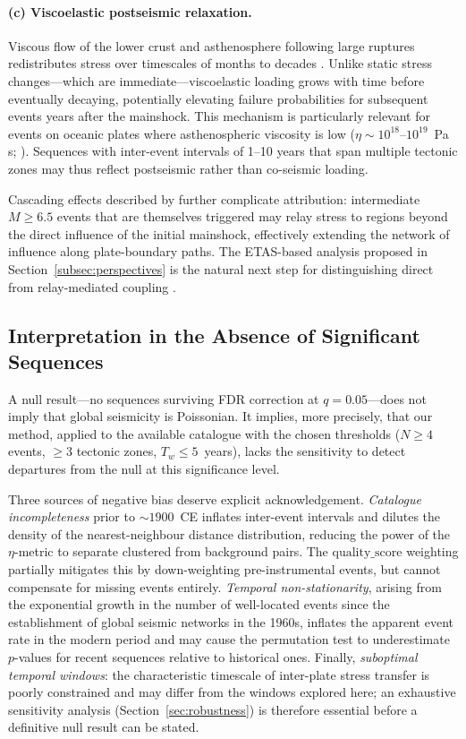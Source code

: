 \paragraph{(c) Viscoelastic postseismic relaxation.}
Viscous flow of the lower crust and asthenosphere following large
ruptures redistributes stress over timescales of months to decades
\citep{Pollitz1998, Freed2001, Freed2005}.  Unlike static stress
changes—which are immediate—viscoelastic loading grows with time before
eventually decaying, potentially elevating failure probabilities for
subsequent events years after the mainshock.  This mechanism is
particularly relevant for events on oceanic plates where asthenospheric
viscosity is low ($\eta \sim 10^{18}$–$10^{19}$~Pa\,s;
\citealt{Pollitz1998}).  Sequences with inter-event intervals of 1–10
years that span multiple tectonic zones may thus reflect postseismic
rather than co-seismic loading.

Cascading effects described by \citet{MarsanLengliene2008} further
complicate attribution: intermediate $M\geq 6.5$ events that are
themselves triggered may relay stress to regions beyond the direct
influence of the initial mainshock, effectively extending the network of
influence along plate-boundary paths.  The ETAS-based analysis proposed
in Section~\ref{subsec:perspectives} is the natural next step for
distinguishing direct from relay-mediated coupling
\citep{HelmstettterSornette2003, Ogata1998}.

\subsection{Interpretation in the Absence of Significant Sequences}
\label{subsec:sequences_absent}

A null result—no sequences surviving FDR correction at $q = 0.05$—does
not imply that global seismicity is Poissonian.  It implies, more
precisely, that our method, applied to the available catalogue with the
chosen thresholds ($N \geq 4$ events, $\geq 3$ tectonic zones, $T_w \leq
5$~years), lacks the sensitivity to detect departures from the null at
this significance level.

Three sources of negative bias deserve explicit acknowledgement.
\emph{Catalogue incompleteness} prior to $\sim\!1900$~CE inflates
inter-event intervals and dilutes the density of the nearest-neighbour
distance distribution, reducing the power of the $\eta$-metric to
separate clustered from background pairs.  The $\mathrm{quality\_score}$
weighting partially mitigates this by down-weighting pre-instrumental
events, but cannot compensate for missing events entirely.
\emph{Temporal non-stationarity}, arising from the exponential growth in
the number of well-located events since the establishment of global
seismic networks in the 1960s, inflates the apparent event rate in the
modern period and may cause the permutation test to underestimate
$p$-values for recent sequences relative to historical ones.  Finally,
\emph{suboptimal temporal windows}: the characteristic timescale of
inter-plate stress transfer is poorly constrained and may differ from the
windows explored here; an exhaustive sensitivity analysis (Section~\ref{sec:robustness})
is therefore essential before a definitive null result can be stated.

